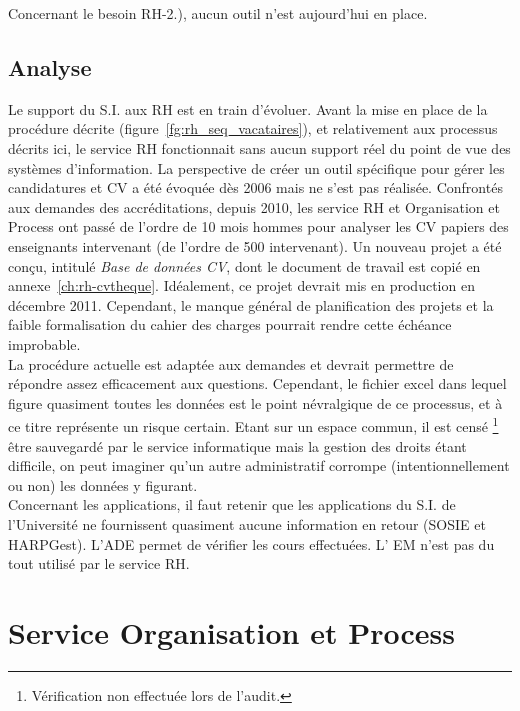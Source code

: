 \documentclass{book}
\begin{document}
Concernant le besoin RH-2.), aucun outil n'est aujourd'hui en place.

\subsection{Analyse}
\label{sc:rh-analyse}
Le support du S.I. aux RH est en train d'évoluer. Avant la mise en place
de la procédure décrite (figure~\ref{fg:rh_seq_vacataires}), et relativement 
aux processus décrits ici, le service RH fonctionnait sans aucun support réel 
du point de vue des systèmes d'information. La perspective de créer un outil 
spécifique pour gérer les candidatures et CV a été évoquée dès 2006 mais ne 
s'est pas réalisée. 
Confrontés aux demandes des accréditations, depuis 2010, les service RH et
Organisation et Process ont passé de l'ordre de 10 mois hommes pour analyser 
les CV papiers des enseignants intervenant (de l'ordre de 500 intervenant). 
Un nouveau projet a été conçu, intitulé \textit{Base de données CV}, dont 
le document de travail est copié en annexe~\ref{ch:rh-cvtheque}.
Idéalement, ce projet devrait mis en production en décembre 2011. 
Cependant, le manque général de planification des projets et la faible 
formalisation du cahier des charges pourrait rendre cette échéance improbable.\\

La procédure actuelle est adaptée aux demandes et devrait permettre de 
répondre assez efficacement aux questions. Cependant, le fichier excel
dans lequel figure quasiment toutes les données est le point névralgique
de ce processus, et à ce titre représente un risque certain. Etant sur
un espace commun, il est censé%
\footnote{Vérification non effectuée lors de l'audit.}
être sauvegardé par le service informatique mais la gestion des droits
étant difficile, on peut imaginer qu'un autre administratif corrompe 
(intentionnellement ou non) les données y figurant.\\

Concernant les applications, il faut retenir que les applications
du S.I. de l'Université ne fournissent quasiment aucune information en
retour (SOSIE et HARPGest). L'ADE permet de vérifier les cours effectuées.
L' EM n'est pas du tout utilisé par le service RH.
 



\section{Service Organisation et Process}
\end{document}
